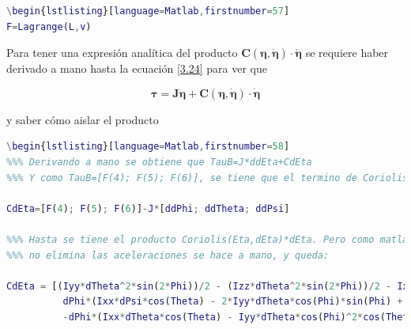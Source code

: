 \documentclass[twoside,11pt]{report}
\begin{document}
\begin{lstlisting}[language=Matlab,firstnumber=56]
\begin{lstlisting}[language=Matlab,firstnumber=57]
F=Lagrange(L,v)
\end{lstlisting}


Para tener una expresión analítica del producto $\pmb{C(\eta,\dot{\eta})\cdot \dot{\eta}}$ se requiere haber derivado a mano hasta la ecuación \ref{3.24} para ver que 

\begin{equation}
\pmb{\tau}=\pmb{J}\ddot{\pmb{\eta}} + \pmb{C(\eta,\dot{\eta})\cdot \dot{\eta}}
\end{equation}

y saber cómo aislar el producto
\singlespacing
\begin{lstlisting}[language=Matlab,firstnumber=57]
\begin{lstlisting}[language=Matlab,firstnumber=58]
%%% Derivando a mano se obtiene que TauB=J*ddEta+CdEta 
%%% Y como TauB=[F(4); F(5); F(6)], se tiene que el termino de Coriolis es:

CdEta=[F(4); F(5); F(6)]-J*[ddPhi; ddTheta; ddPsi]

%%% Hasta se tiene el producto Coriolis(Eta,dEta)*dEta. Pero como matlab
%%% no elimina las aceleraciones se hace a mano, y queda:

CdEta = [(Iyy*dTheta^2*sin(2*Phi))/2 - (Izz*dTheta^2*sin(2*Phi))/2 - Ixx*dPsi*dTheta*cos(Theta) - (Iyy*dPsi^2*sin(2*Phi)*cos(Theta)^2)/2 + (Izz*dPsi^2*sin(2*Phi)*cos(Theta)^2)/2 - Iyy*dPsi*dTheta*cos(2*Phi)*cos(Theta) + Izz*dPsi*dTheta*cos(2*Phi)*cos(Theta);
          dPhi*(Ixx*dPsi*cos(Theta) - 2*Iyy*dTheta*cos(Phi)*sin(Phi) + 2*Izz*dTheta*cos(Phi)*sin(Phi) + Iyy*dPsi*cos(Phi)^2*cos(Theta) - Izz*dPsi*cos(Phi)^2*cos(Theta) - Iyy*dPsi*cos(Theta)*sin(Phi)^2 + Izz*dPsi*cos(Theta)*sin(Phi)^2)  - Ixx*dPsi^2*cos(Theta)*sin(Theta) + Iyy*dPsi^2*cos(Theta)*sin(Phi)^2*sin(Theta)  + Izz*dPsi^2*cos(Phi)^2*cos(Theta)*sin(Theta);
          -dPhi*(Ixx*dTheta*cos(Theta) - Iyy*dTheta*cos(Phi)^2*cos(Theta) + Izz*dTheta*cos(Phi)^2*cos(Theta) + Iyy*dTheta*cos(Theta)*sin(Phi)^2 - Izz*dTheta*cos(Theta)*sin(Phi)^2 - 2*Iyy*dPsi*cos(Phi)*cos(Theta)^2*sin(Phi) + 2*Izz*dPsi*cos(Phi)*cos(Theta)^2*sin(Phi)) - Iyy*dTheta^2*cos(Phi)*sin(Phi)*sin(Theta) + Izz*dTheta^2*cos(Phi)*sin(Phi)*sin(Theta) + 2*Ixx*dPsi*dTheta*cos(Theta)*sin(Theta) - 2*Izz*dPsi*dTheta*cos(Phi)^2*cos(Theta)*sin(Theta) - 2*Iyy*dPsi*dTheta*cos(Theta)*sin(Phi)^2*sin(Theta)]     
\end{lstlisting}
\onehalfspacing
\end{document}
